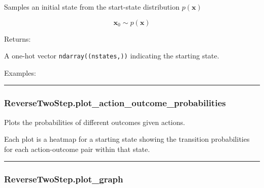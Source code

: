 Samples an initial state from the start-state distribution
\(p(\mathbf x)\)

\[
\mathbf x_0 \sim p(\mathbf x)
\]

Returns:

A one-hot vector \texttt{ndarray((nstates,))} indicating the starting
state.

Examples:

\begin{Shaded}
\begin{Highlighting}[]
\OperatorTok{=}
\end{Highlighting}
\end{Shaded}

\begin{center}\rule{0.5\linewidth}{\linethickness}\end{center}

\subsubsection{ReverseTwoStep.plot\_action\_outcome\_probabilities}\label{reversetwostep.plot_action_outcome_probabilities}

\begin{Shaded}
\begin{Highlighting}[]
\OperatorTok{=}\OperatorTok{=}\OperatorTok{=}\OperatorTok{=}\NormalTok{)}
\end{Highlighting}
\end{Shaded}

Plots the probabilities of different outcomes given actions.

Each plot is a heatmap for a starting state showing the transition
probabilities for each action-outcome pair within that state.

\begin{center}\rule{0.5\linewidth}{\linethickness}\end{center}

\subsubsection{ReverseTwoStep.plot\_graph}\label{reversetwostep.plot_graph}

\begin{Shaded}
\begin{Highlighting}[]
\OperatorTok{=}\OperatorTok{=}\OperatorTok{=}\OperatorTok{=}\OperatorTok{=}\OperatorTok{=}\OperatorTok{=}\OperatorTok{=}\NormalTok{)}
\end{Highlighting}
\end{Shaded}

